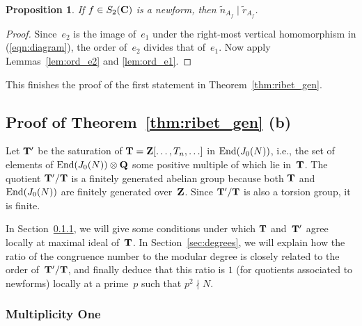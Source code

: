 \documentclass[10pt,twoside]{article}
\newcommand{\Z}{{\bf{Z}}}
\newcommand{\Q}{{\bf{Q}}}
\newcommand{\C}{{\bf{C}}}
\newcommand{\T}{{\bf{T}}}
\newcommand{\tensor}{\otimes}
\newcommand{\rAfe}{{\tilde{r}_{\scriptscriptstyle{A_f}}}}
\newcommand{\nAfe}{{\tilde{n}_{\scriptscriptstyle{A_f}}}}
\newcommand{\End}{{\rm End}}
\newtheorem{prop}[lem]{Proposition}
\theoremstyle{definition}
\begin{document}
\begin{prop} \label{ndivsm}
If $f \in S_2(\C)$ is a newform, then
$\nAfe \mid \rAfe$. 
\end{prop}
\begin{proof}
  Since~$e_2$ is the image of~$e_1$ under the right-most
vertical homomorphism in (\ref{eqn:diagram}), the order
  of~$e_2$ divides that of~$e_1$.  Now
apply Lemmas~\ref{lem:ord_e2} and \ref{lem:ord_e1}. 
\end{proof}

This finishes the proof of the first statement in 
Theorem~\ref{thm:ribet_gen}.




\subsection{Proof of Theorem~\ref{thm:ribet_gen} (b)}
\label{sec:secondpart}
Let $\T'$ be the saturation of $\T=\Z[\ldots, T_n,\ldots]$ in
$\End(J_0(N))$, i.e., the set of elements of $\End(J_0(N)) \tensor \Q$
some positive multiple of which lie in~$\T$.
The
quotient $\T'/\T$ is a finitely generated abelian group because both
$\T$ and $\End(J_0(N))$ are finitely generated over~$\Z$. Since 
$\T'/\T$ is also a torsion group, it is finite.

In Section~\ref{sec:multone}, we will give some conditions under
which $\T$ and~$\T'$ agree locally at  maximal ideal of~$\T$.
In Section~\ref{sec:degrees}, we will explain how the ratio of
the congruence number to the modular degree is closely related
to the order of~$\T'/\T$, and finally deduce that this ratio is $1$ 
(for quotients associated to newforms) locally at a prime~$p$
such that $p^2 \nmid N$.

\subsubsection{Multiplicity One} \label{sec:multone}
\end{document}
